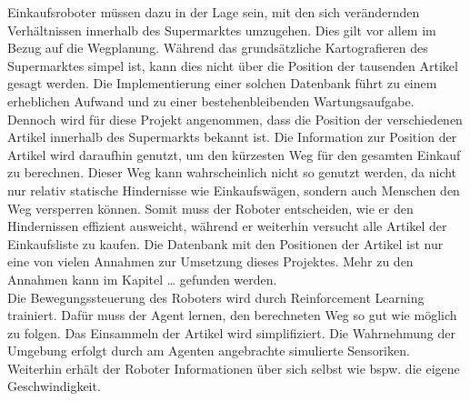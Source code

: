 Einkaufsroboter müssen dazu in der Lage sein, mit den sich verändernden Verhältnissen innerhalb des Supermarktes umzugehen. Dies gilt vor allem im Bezug auf die Wegplanung. Während das grundsätzliche Kartografieren des Supermarktes simpel ist, kann dies nicht über die Position der tausenden Artikel gesagt werden. Die Implementierung einer solchen Datenbank führt zu einem erheblichen Aufwand und zu einer bestehenbleibenden Wartungsaufgabe. Dennoch wird für diese Projekt angenommen, dass die Position der verschiedenen Artikel innerhalb des Supermarkts bekannt ist. Die Information zur Position der Artikel wird daraufhin genutzt, um den kürzesten Weg für den gesamten Einkauf zu berechnen. Dieser Weg kann wahrscheinlich nicht so genutzt werden, da nicht nur relativ statische Hindernisse wie Einkaufswägen, sondern auch Menschen den Weg versperren können. Somit muss der Roboter entscheiden, wie er den Hindernissen effizient ausweicht, während er weiterhin versucht alle Artikel der Einkaufsliste zu kaufen. Die Datenbank mit den Positionen der Artikel ist nur eine von vielen Annahmen zur Umsetzung dieses Projektes. Mehr zu den Annahmen kann im Kapitel … gefunden werden.
\\
Die Bewegungssteuerung des Roboters wird durch Reinforcement Learning trainiert. Dafür muss der Agent lernen, den berechneten Weg so gut wie möglich zu folgen. Das Einsammeln der Artikel wird simplifiziert. Die Wahrnehmung der Umgebung erfolgt durch am Agenten angebrachte simulierte Sensoriken. Weiterhin erhält der Roboter Informationen über sich selbst wie bspw. die eigene Geschwindigkeit.
